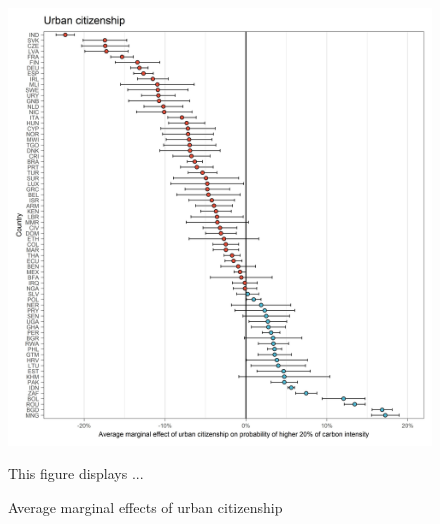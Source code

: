 \documentclass[12pt, a4paper]{article}
\newenvironment{subcaption}
{\strut
\vspace{-5pt}
\begin{minipage}[b]{0.9\textwidth}
  \hspace*{-\parindent}
  \footnotesize}
 {\end{minipage}}
\begin{document}
 \begin{figure}[ht!]
   \centering
   \caption{Average marginal effects of urban citizenship} \label{fig:F5_Urban}
   \includegraphics{Analysis_Logit_Models_Marginal_Effects/Average_Marginal_Effects_affected_upper_80_urban_01}
   \begin{subcaption}
     This figure displays ...
   \end{subcaption}
 \end{figure}

 \clearpage
\end{document}
